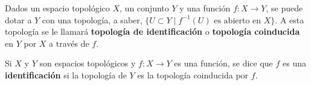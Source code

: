 

\begin{definition}
Dados un espacio topológico $X$, un conjunto $Y$ y una función $f : X \longrightarrow Y$, se puede dotar a $Y$ con una topología, a saber, $\{ U \subset Y \mid f^{-1}(U) \text{ es abierto en } X \}$. A esta topología se le llamará \textbf{topología de identificación} o \textbf{topología coinducida} en $Y$ por $X$ a través de $f$.
\end{definition}

\begin{definition}
Si $X$ y $Y$ son espacios topológicos y $f : X \longrightarrow Y$ es una función, se dice que $f$ es una \textbf{identificación} si la topología de $Y$ es la topología coinducida por $f$.
\end{definition}
